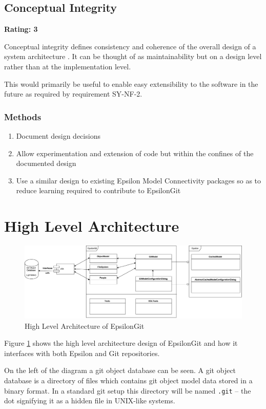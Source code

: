 \documentclass[11pt]{book}
\newcommand{\code}[1]{\texttt{#1}}
\begin{document}
\subsection{Conceptual Integrity}
\textbf{Rating: 3}

Conceptual integrity defines consistency and coherence of the overall design of a system architecture \cite{qualitymicrosoft}. It can be thought of as maintainability but on a design level rather than at the implementation level. 

This would primarily be useful to enable easy extensibility to the software in the future as required by requirement SY-NF-2. 

\subsubsection{Methods}
\begin{enumerate}
	\item Document design decisions
	\item Allow experimentation and extension of code but within the confines of the documented design
	\item Use a similar design to existing Epsilon Model Connectivity packages so as to reduce learning required to contribute to EpsilonGit 
\end{enumerate}

\section{High Level Architecture}
\label{hla}
\begin{figure}[H]
	\centering
	\includegraphics[width=\textwidth]{images/arch}
	\caption{High Level Architecture of EpsilonGit}
	\label{fig:hla}
\end{figure}

Figure \ref{fig:hla} shows the high level architecture design of EpsilonGit and how it interfaces with both Epsilon and Git repositories.

On the left of the diagram a git object database can be seen. A git object database is a directory of files which contains git object model data stored in a binary format. In a standard git setup this directory will be named \code{.git} -- the dot signifying it as a hidden file in UNIX-like systems.
\end{document}
